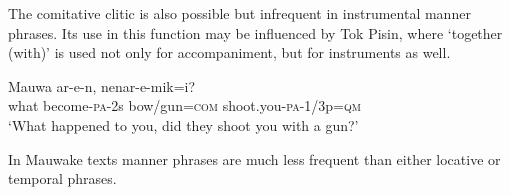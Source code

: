 The comitative clitic is also possible but infrequent in instrumental manner phrases. Its use in this function may be influenced by Tok Pisin, where  `together (with)' is used not only for accompaniment, but for instruments as well.

\ea%
\label{ex:4:x890}
\gll Mauwa  ar-e-n,    nenar-e-mik=i? \\
 what  become-\textsc{pa}-2s  bow/gun=\textsc{com}  shoot.you-\textsc{pa}-1/3p=\textsc{qm}     \\
\glt`What happened to you, did they shoot you with a gun?'
\z

In Mauwake texts manner phrases are much less frequent than either locative or temporal phrases.


